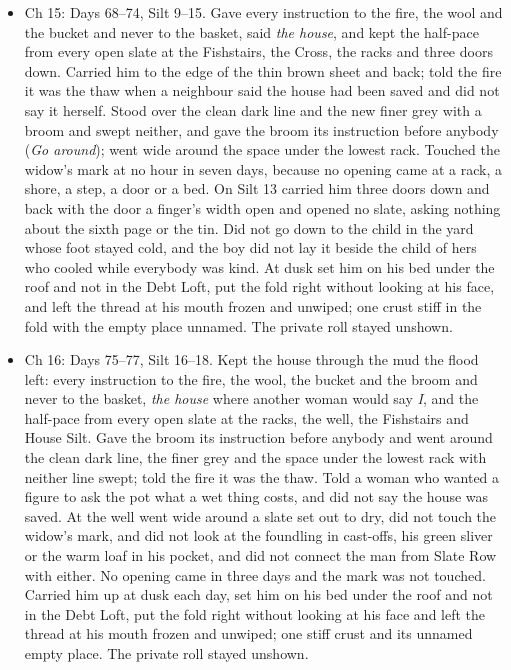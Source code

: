 \documentclass{design/chronicle}
\begin{document}
{\begin{itemize}[leftmargin=1.4em,itemsep=1pt,topsep=3pt,parsep=0pt]
\end{itemize}

\begin{itemize}[leftmargin=1.4em,itemsep=1pt,topsep=3pt,parsep=0pt]

\item Ch 15: Days 68–74, Silt 9–15. Gave every instruction to the fire, the wool and the bucket and never to the basket, said \emph{the house}, and kept the half-pace from every open slate at the Fishstairs, the Cross, the racks and three doors down. Carried him to the edge of the thin brown sheet and back; told the fire it was the thaw when a neighbour said the house had been saved and did not say it herself. Stood over the clean dark line and the new finer grey with a broom and swept neither, and gave the broom its instruction before anybody (\emph{Go around}); went wide around the space under the lowest rack. Touched the widow’s mark at no hour in seven days, because no opening came at a rack, a shore, a step, a door or a bed. On Silt 13 carried him three doors down and back with the door a finger’s width open and opened no slate, asking nothing about the sixth page or the tin. Did not go down to the child in the yard whose foot stayed cold, and the boy did not lay it beside the child of hers who cooled while everybody was kind. At dusk set him on his bed under the roof and not in the Debt Loft, put the fold right without looking at his face, and left the thread at his mouth frozen and unwiped; one crust stiff in the fold with the empty place unnamed. The private roll stayed unshown.

\end{itemize}

\begin{itemize}[leftmargin=1.4em,itemsep=1pt,topsep=3pt,parsep=0pt]

\item Ch 16: Days 75–77, Silt 16–18. Kept the house through the mud the flood left: every instruction to the fire, the wool, the bucket and the broom and never to the basket, \emph{the house} where another woman would say \emph{I}, and the half-pace from every open slate at the racks, the well, the Fishstairs and House Silt. Gave the broom its instruction before anybody and went around the clean dark line, the finer grey and the space under the lowest rack with neither line swept; told the fire it was the thaw. Told a woman who wanted a figure to ask the pot what a wet thing costs, and did not say the house was saved. At the well went wide around a slate set out to dry, did not touch the widow’s mark, and did not look at the foundling in cast-offs, his green sliver or the warm loaf in his pocket, and did not connect the man from Slate Row with either. No opening came in three days and the mark was not touched. Carried him up at dusk each day, set him on his bed under the roof and not in the Debt Loft, put the fold right without looking at his face and left the thread at his mouth frozen and unwiped; one stiff crust and its unnamed empty place. The private roll stayed unshown.


\end{itemize}}
\end{document}
